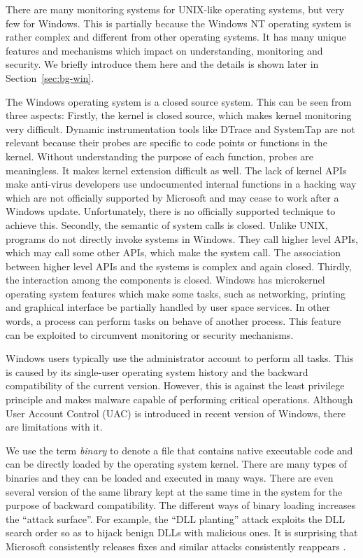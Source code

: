 
There are many monitoring systems for UNIX-like operating systems,
but very few for Windows.
This is partially because
the Windows NT operating system is rather complex and different from other
operating systems.
It has many unique features and mechanisms which impact on understanding,
monitoring and security.
We briefly introduce them here and the details is shown later
in Section~\ref{sec:bg-win}.

The Windows operating system is a closed source system.
This can be seen from three aspects:
Firstly, the kernel is closed source, which makes kernel monitoring very difficult.
Dynamic instrumentation tools like DTrace and SystemTap are not relevant because
their probes are specific to code points or functions in the kernel.
Without understanding the purpose of each function, probes are meaningless.
It makes kernel extension difficult as well.
The lack of kernel APIs make anti-virus developers use undocumented internal
functions in a hacking way which are
not officially supported by Microsoft and may cease to work
after a Windows update.
Unfortunately, there is no officially supported technique to achieve this.
Secondly, the semantic of system calls is closed.
Unlike UNIX, programs do not directly invoke systems in Windows.
They call higher level APIs, which may call some other APIs, which make
the system call.
The association between higher level APIs and the systems is complex and
again closed.
Thirdly, the interaction among the components is closed.
Windows has microkernel operating system features which make
some tasks, such as networking, printing and graphical interface be partially
handled by user space services.
In other words, a process can perform tasks on behave of another process.
This feature can be exploited to circumvent monitoring or
security mechanisms.

Windows users typically use the administrator account to perform all tasks.
This is caused by its single-user operating system history and the backward
compatibility of the current version.
However, this is against the least privilege principle and makes malware
capable of performing critical operations.
Although User Account Control (UAC) is introduced in recent version of
Windows, there are limitations with it.

We use the term {\em binary} to denote a file that contains
native executable code and can be directly loaded by the operating system kernel.
There are many types of binaries and they can be loaded
and executed in many ways.
There are even several version of the same library kept at the same time
in the system for the purpose of backward compatibility.
The different ways of binary loading increases the ``attack surface''.
For example, the ``DLL planting'' attack exploits the DLL search order
so as to hijack benign DLLs with malicious ones.
It is surprising that Microsoft consistently releases fixes and similar attacks
consistently reappears \cite{binary-planting}.

